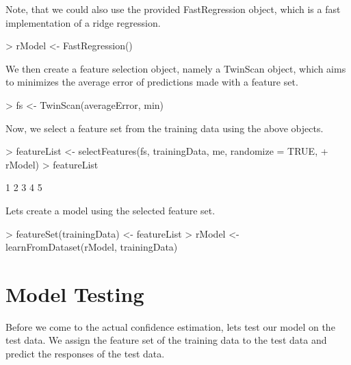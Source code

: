 \documentclass{article}
\begin{document}
Note, that we could also use the provided FastRegression 
object, which is a fast implementation of a ridge regression.

\begin{Schunk}
\begin{Sinput}
> rModel <- FastRegression()
\end{Sinput}
\end{Schunk}

We then create a feature selection object, namely a TwinScan
object, which aims to minimizes the average
error of predictions made with a feature set.

\begin{Schunk}
\begin{Sinput}
> fs <- TwinScan(averageError, min)
\end{Sinput}
\end{Schunk}

Now, we select a feature set from the training data using the
above objects.

\begin{Schunk}
\begin{Sinput}
> featureList <- selectFeatures(fs, trainingData, me, randomize = TRUE, 
+     rModel)
> featureList
\end{Sinput}
\begin{Soutput}
[1] 1 2 3 4 5
\end{Soutput}
\end{Schunk}

Lets create a model using the selected feature set.

\begin{Schunk}
\begin{Sinput}
> featureSet(trainingData) <- featureList
> rModel <- learnFromDataset(rModel, trainingData)
\end{Sinput}
\end{Schunk}

\section{Model Testing}

Before we come to the actual confidence estimation, lets test
our model on the test data. We assign the feature set
of the training data to the test data and predict the
responses of the test data.
\end{document}

